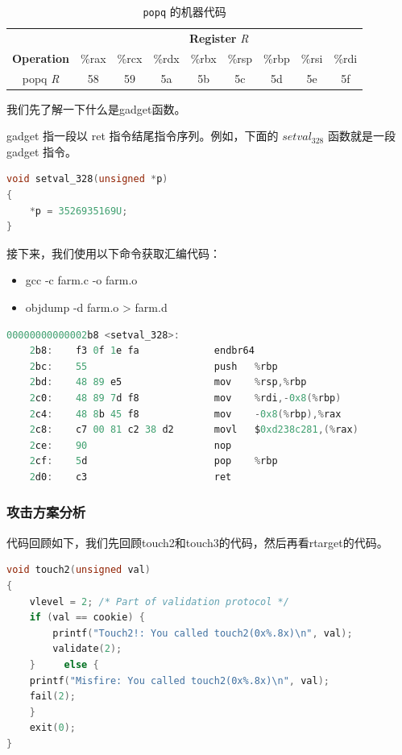 \begin{table}[ht]
    \centering
    \begin{tabular}{|c|c|c|c|c|c|c|c|c|}
        \hline
        & \multicolumn{8}{c|}{\textbf{Register} \textit{R}} \\
        \cline{2-9}
        \textbf{Operation} & \%rax & \%rcx & \%rdx & \%rbx & \%rsp & \%rbp & \%rsi & \%rdi \\
        \hline
        popq \textit{R}    & 58    & 59    & 5a    & 5b    & 5c    & 5d    & 5e    & 5f    \\
        \hline
    \end{tabular}
    \caption{\texttt{popq} 的机器代码}
    \label{tab:popq-reference}
\end{table}

我们先了解一下什么是gadget函数。

gadget 指一段以 ret 指令结尾指令序列。例如，下面的 $setval_328$ 函数就是一段 gadget 指令。
\begin{lstlisting}[language = C]
void setval_328(unsigned *p)
{
    *p = 3526935169U;
}
\end{lstlisting}

接下来，我们使用以下命令获取汇编代码：
\begin{itemize}
    \item gcc -c farm.c -o farm.o
    \item objdump -d farm.o > farm.d
\end{itemize}

\begin{lstlisting}[language = C]
    00000000000002b8 <setval_328>:
    2b8:	f3 0f 1e fa          	endbr64 
    2bc:	55                   	push   %rbp
    2bd:	48 89 e5             	mov    %rsp,%rbp
    2c0:	48 89 7d f8          	mov    %rdi,-0x8(%rbp)
    2c4:	48 8b 45 f8          	mov    -0x8(%rbp),%rax
    2c8:	c7 00 81 c2 38 d2    	movl   $0xd238c281,(%rax)
    2ce:	90                   	nop
    2cf:	5d                   	pop    %rbp
    2d0:	c3                   	ret   
\end{lstlisting}

\subsubsection{攻击方案分析}
代码回顾如下，我们先回顾touch2和touch3的代码，然后再看rtarget的代码。
\begin{lstlisting}[language = C,title = touch2.c]
void touch2(unsigned val)
{
    vlevel = 2; /* Part of validation protocol */
    if (val == cookie) {
        printf("Touch2!: You called touch2(0x%.8x)\n", val);
        validate(2);
    }     else {
    printf("Misfire: You called touch2(0x%.8x)\n", val);
    fail(2);
    }
    exit(0);
}
\end{lstlisting}

